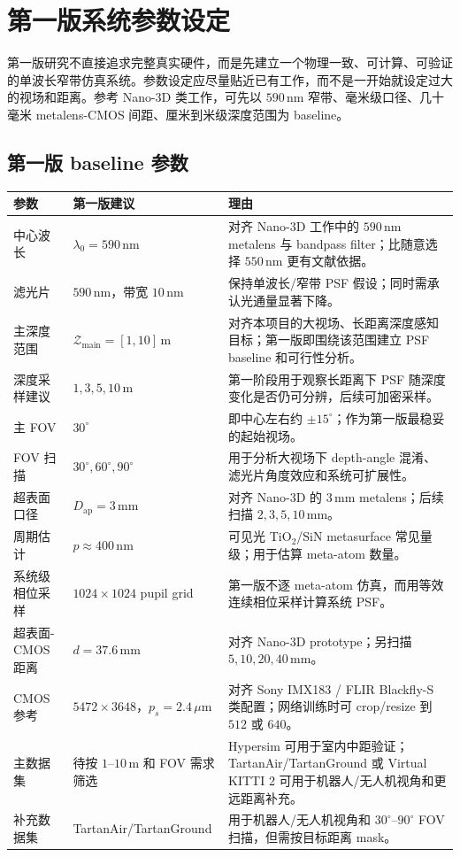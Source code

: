 \documentclass[11pt,a4paper,fontset=none]{ctexart}
\begin{document}
\section{第一版系统参数设定}

第一版研究不直接追求完整真实硬件，而是先建立一个物理一致、可计算、可验证的单波长窄带仿真系统。参数设定应尽量贴近已有工作，而不是一开始就设定过大的视场和距离。参考 Nano-3D 类工作，可先以 $590\,\mathrm{nm}$ 窄带、毫米级口径、几十毫米 metalens-CMOS 间距、厘米到米级深度范围为 baseline。

\subsection{第一版 baseline 参数}

\begin{longtable}{p{3.2cm}p{4.2cm}p{7.0cm}}
\toprule
参数 & 第一版建议 & 理由 \\
\midrule
\endhead
中心波长 & $\lambda_0=590\,\mathrm{nm}$ & 对齐 Nano-3D 工作中的 $590\,\mathrm{nm}$ metalens 与 bandpass filter；比随意选择 $550\,\mathrm{nm}$ 更有文献依据。 \\
\addlinespace
滤光片 & $590\,\mathrm{nm}$，带宽 $10\,\mathrm{nm}$ & 保持单波长/窄带 PSF 假设；同时需承认光通量显著下降。 \\
\addlinespace
主深度范围 & $\mathcal Z_{\mathrm{main}}=[1,10]\,\mathrm{m}$ & 对齐本项目的大视场、长距离深度感知目标；第一版即围绕该范围建立 PSF baseline 和可行性分析。 \\
\addlinespace
深度采样建议 & $1,3,5,10\,\mathrm{m}$ & 第一阶段用于观察长距离下 PSF 随深度变化是否仍可分辨，后续可加密采样。 \\
\addlinespace
主 FOV & $30^\circ$ & 即中心左右约 $\pm15^\circ$；作为第一版最稳妥的起始视场。 \\
\addlinespace
FOV 扫描 & $30^\circ,60^\circ,90^\circ$ & 用于分析大视场下 depth-angle 混淆、滤光片角度效应和系统可扩展性。 \\
\addlinespace
超表面口径 & $D_{\mathrm{ap}}=3\,\mathrm{mm}$ & 对齐 Nano-3D 的 $3\,\mathrm{mm}$ metalens；后续扫描 $2,3,5,10\,\mathrm{mm}$。 \\
\addlinespace
周期估计 & $p\approx400\,\mathrm{nm}$ & 可见光 TiO$_2$/SiN metasurface 常见量级；用于估算 meta-atom 数量。 \\
\addlinespace
系统级相位采样 & $1024\times1024$ pupil grid & 第一版不逐 meta-atom 仿真，而用等效连续相位采样计算系统 PSF。 \\
\addlinespace
超表面-CMOS 距离 & $d=37.6\,\mathrm{mm}$ & 对齐 Nano-3D prototype；另扫描 $5,10,20,40\,\mathrm{mm}$。 \\
\addlinespace
CMOS 参考 & $5472\times3648$，$p_s=2.4\,\mu\mathrm{m}$ & 对齐 Sony IMX183 / FLIR Blackfly-S 类配置；网络训练时可 crop/resize 到 $512$ 或 $640$。 \\
\addlinespace
主数据集 & 待按 $1$--$10\,\mathrm{m}$ 和 FOV 需求筛选 & Hypersim 可用于室内中距验证；TartanAir/TartanGround 或 Virtual KITTI 2 可用于机器人/无人机视角和更远距离补充。 \\
\addlinespace
补充数据集 & TartanAir/TartanGround & 用于机器人/无人机视角和 $30^\circ$--$90^\circ$ FOV 扫描，但需按目标距离 mask。 \\
\bottomrule
\end{longtable}
\end{document}
